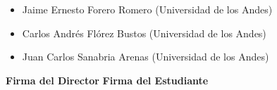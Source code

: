 \documentclass[12pt]{article}
\begin{document}
\begin{itemize}
	\item Jaime Ernesto Forero Romero (Universidad de los Andes)
	\item Carlos Andrés Flórez Bustos (Universidad de los Andes)
	\item Juan Carlos Sanabria Arenas (Universidad de los Andes)
\end{itemize}


{}



{\bf Firma del Director} \hfill {\bf Firma del Estudiante}

\vspace{1.5cm}
\end{document}
